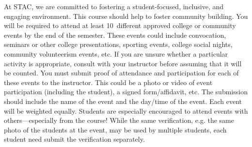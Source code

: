 \documentclass[11pt,letterpaper]{article}
\begin{document}
At STAC, we are committed to fostering a student-focused, inclusive, and engaging environment. This course should help to foster community building. You will be required to attend at least 10~different approved college or community events by the end of the semester. These events could include convocation, seminars or other college presentations, sporting events, college social nights, community volunteerism events, etc. If you are unsure whether a particular activity is appropriate, consult with your instructor before assuming that it will be counted. You must submit proof of attendance and participation for each of these events to the instructor. This could be a photo or video of event participation (including the student), a signed form/affidavit, etc. The submission should include the name of the event and the day/time of the event. Each event will be weighted equally. Students are especially encouraged to attend events with others---especially from the course! While the same verification, e.g. the same photo of the students at the event, may be used by multiple students, each student need submit the verification separately. \pspace


\newpage
\end{document}
